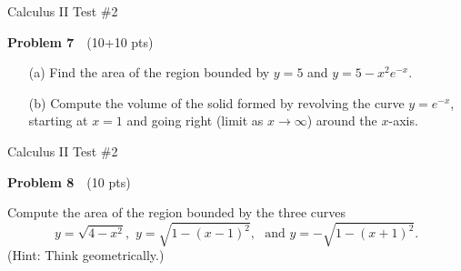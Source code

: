 \documentclass[10pt]{article}
\newcommand{\prob}[1]{\vspace{10mm} \noindent \textbf{Problem #1} \,\,}
\newcommand{\header}{
\begin{center}
Calculus II Test \#2
\end{center}

\vspace{2mm}

}
\begin{document}
\header

\prob{7} (10+10 pts) 

\begin{itemize}
\item[(a) ] Find the area of the region bounded by $y = 5$ and $y = 5 - x^2 e^{-x}$.
\item[(b) ] Compute the volume of the solid formed by revolving the curve $y = e^{-x}$, starting at $x=1$ and going right (limit as $x \to \infty$) around the $x$-axis.
\end{itemize}

\pagebreak

\header

\prob{8} (10 pts)

Compute the area of the region bounded by the three curves 
\[ y = \sqrt{4 - x^2}, \,\, y = \sqrt{1 - (x-1)^2}, \,\, \text{ and } y = -\sqrt{1 - (x+1)^2}. \]
(Hint: Think geometrically.)
\end{document}
